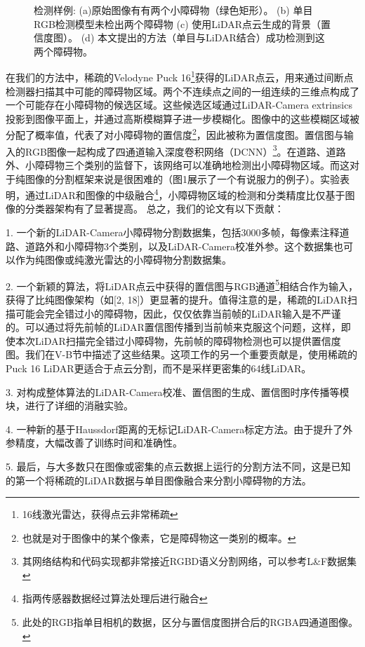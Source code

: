 \documentclass[lang=cn,11pt]{elegantpaper}
\begin{document}
\begin{figure}[htbp]
{\begin{minipage}[b]{.3\linewidth}
        \end{minipage}
    }
    \caption{检测样例: (a)原始图像有有两个小障碍物（绿色矩形）。 (b) 单目RGB检测模型未检出两个障碍物 (c) 使用LiDAR点云生成的背景（置信度图）。 (d) 本文提出的方法（单目与LiDAR结合）成功检测到这两个障碍物。 }
\end{figure}

在我们的方法中，稀疏的Velodyne Puck 16\footnote{16线激光雷达，获得点云非常稀疏}获得的LiDAR点云，用来通过间断点检测器扫描其中可能的障碍物区域。两个不连续点之间的一组连续的三维点构成了一个可能存在小障碍物的候选区域。这些候选区域通过LiDAR-Camera extrinsics投影到图像平面上，并通过高斯模糊算子进一步模糊化。图像中的这些模糊区域被分配了概率值，代表了对小障碍物的置信度\footnote{也就是对于图像中的某个像素，它是障碍物这一类别的概率。}，因此被称为置信度图。置信图与输入的RGB图像一起构成了四通道输入深度卷积网络（DCNN）\footnote{其网络结构和代码实现都非常接近RGBD语义分割网络，可以参考L&F数据集}。在道路、道路外、小障碍物三个类别的监督下，该网络可以准确地检测出小障碍物区域。而这对于纯图像的分割框架来说是很困难的（图1展示了一个有说服力的例子）。实验表明，通过LiDAR和图像的中级融合\footnote{指两传感器数据经过算法处理后进行融合}，小障碍物区域的检测和分类精度比仅基于图像的分类器架构有了显著提高。
总之，我们的论文有以下贡献：

1. 一个新的LiDAR-Camera小障碍物分割数据集，包括3000多帧，每像素注释道路、道路外和小障碍物3个类别，以及LiDAR-Camera校准外参。这个数据集也可以作为纯图像或纯激光雷达的小障碍物分割数据集。  

2. 一个新颖的算法，将LiDAR点云中获得的置信图与RGB通道\footnote{此处的RGB指单目相机的数据，区分与置信度图拼合后的RGBA四通道图像。}相结合作为输入，获得了比纯图像架构（如[2, 18]）更显著的提升。值得注意的是，稀疏的LiDAR扫描可能会完全错过小的障碍物，因此，仅仅依靠当前帧的LiDAR输入是不严谨的。可以通过将先前帧的LiDAR置信图传播到当前帧来克服这个问题，这样，即使本次LiDAR扫描完全错过小障碍物，先前帧的障碍物检测也可以提供置信度图。我们在V-B节中描述了这些结果。这项工作的另一个重要贡献是，使用稀疏的Puck 16 LiDAR更适合于点云分割，而不是采样更密集的64线LiDAR。

3. 对构成整体算法的LiDAR-Camera校准、置信图的生成、置信图时序传播等模块，进行了详细的消融实验。

4. 一种新的基于Haussdorf距离的无标记LiDAR-Camera标定方法。由于提升了外参精度，大幅改善了训练时间和准确性。

5. 最后，与大多数只在图像或密集的点云数据上运行的分割方法不同，这是已知的第一个将稀疏的LiDAR数据与单目图像融合来分割小障碍物的方法。
\end{document}
